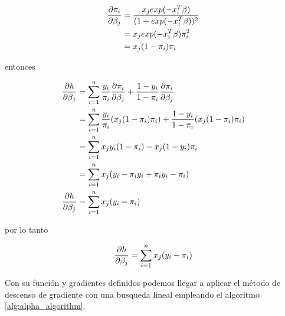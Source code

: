 \begin{align*}
    \frac{\partial \pi_i}{\partial \beta_j} & = \frac{x_j exp(-x^T_i\beta)}{(1+exp(-x_i^T\beta))^2} \\
                              & = x_j exp(-x_i^T\beta) \pi_i^2                        \\
                              & = x_j (1-\pi_i) \pi_i
\end{align*}

entonces

\begin{align*}
    \frac{\partial h}{\partial \beta_j} & =\sum_{i=1}^n \frac{y_i}{\pi_i} \frac{\partial \pi_i}{\partial \beta_j} + \frac{1-y_i}{1-\pi_i} \frac{\partial \pi_i}{\partial \beta_j} \\
                          & =\sum_{i=1}^n \frac{y_i}{\pi_i} (x_j (1-\pi_i) \pi_i) + \frac{1-y_i}{1-\pi_i} (x_j (1-\pi_i) \pi_i)         \\
                          & =\sum_{i=1}^n x_j y_i(1-\pi_i) - x_j (1-y_i)\pi_i                                                           \\
                          & = \sum_{i=1}^n x_j (y_i-\pi_iy_i+\pi_iy_i-\pi_i)                                                            \\
    \frac{\partial h}{\partial \beta_j} & = \sum_{i=1}^n x_j (y_i-\pi_i)
\end{align*}

por lo tanto

\begin{equation}
    \frac{\partial h}{\partial \beta_j}  = \sum_{i=1}^n x_j (y_i-\pi_i)   \label{eq:grad_log_likelihood}
\end{equation}

Con su función y gradientes definidos podemos llegar a aplicar el método de descenso de gradiente con una busqueda lineal empleando el algoritmo \ref{alg:alpha_algorithm}.